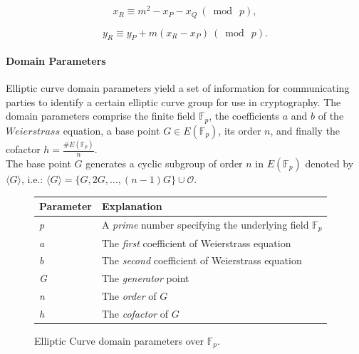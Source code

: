 \begin{equation}
x_{R}\equiv m^{2}-x_{P}-x_{Q}\ (\bmod\ p),
\end{equation}

\begin{equation}
y_{R}\equiv y_{P}+m(x_{R}-x_{P})\ (\bmod\ p).
\end{equation}

\paragraph{Domain Parameters}
Elliptic curve domain parameters yield a set of information for communicating parties to identify a certain elliptic curve group for use in cryptography. The domain parameters comprise the finite field $\mathbb{F}_{p}$, the coefficients $a$ and $b$ of the $Weierstrass$ equation, a base point $G\in E(\mathbb{F}_{p})$, its order $n$,
and finally the cofactor $h=\frac{\#E(\mathbb{F}_{p})}{n}$. \\
The base point $G$ generates a cyclic subgroup of order $n$ in $E(\mathbb{F}_{p})$ denoted by $\langle{G}\rangle$, i.e.:
$\langle{G}\rangle= \{G, 2G,\dots, (n-1)G\} \cup {\mathcal{O}}$.

\begin{figure}[H]
	\centering
	\begin{tabular}{|l|l|}
		\hline
		\textbf{Parameter} & \textbf{Explanation}\\
		\hline
		\hline
		\textit{p} & A \textit{prime} number specifying the underlying field $\mathbb{F}_{p}$ \\
		\hline
		\textit{a} & The \textit{first} coefficient of Weierstrass equation \\
		\hline
		\textit{b} & The \textit{second} coefficient of Weierstrass equation \\
		\hline
		\textit{G} & The \textit{generator} point \\
		\hline
		\textit{n} & The \textit{order} of $G$ \\
		\hline
		\textit{h} & The \textit{cofactor} of $G$ \\
		\hline
	\end{tabular}
	\caption{Elliptic Curve domain parameters over $\mathbb{F}_{p}$\cite{ECC}.}
	\label{EC:dom par}
\end{figure}


